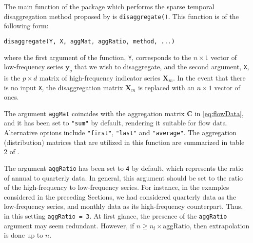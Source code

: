 The main function of the package which performs the sparse temporal disaggregation method proposed by \citet{10-1111rssa-12952} is \texttt{disaggregate()}. This function is of the following form:

\begin{verbatim}
disaggregate(Y, X, aggMat, aggRatio, method, ...)
\end{verbatim}

where the first argument of the function, \texttt{Y}, corresponds to the \(n\times 1\) vector of low-frequency series \(\mathbf{y}_q\) that we wish to disaggregate, and the second argument, \texttt{X}, is the \(p\times d\) matrix of high-frequency indicator series \(\mathbf{X}_m\). In the event that there is no input \texttt{X}, the disaggregation matrix \(\mathbf{X}_m\) is replaced with an \(n\times 1\) vector of ones.

The argument \texttt{aggMat} coincides with the aggregation matrix \(\mathbf{C}\) in \eqref{eq:flowData}, and it has been set to \texttt{"sum"} by default, rendering it suitable for flow data. Alternative options include \texttt{"first"}, \texttt{"last"} and \texttt{"average"}. The aggregation (distribution) matrices that are utilized in this function are summarized in table 2 of \citet{sax2016package}.

The argument \texttt{aggRatio} has been set to \texttt{4} by default, which represents the ratio of annual to quarterly data. In general, this argument should be set to the ratio of the high-frequency to low-frequency series. For instance, in the examples considered in the preceding Sections, we had considered quarterly data as the low-frequency series, and monthly data as its high-frequency counterpart. Thus, in this setting \texttt{aggRatio\ =\ 3}. At first glance, the presence of the \texttt{aggRatio} argument may seem redundant. However, if \(n\geq n_l\times \text{aggRatio}\), then extrapolation is done up to \(n\).

